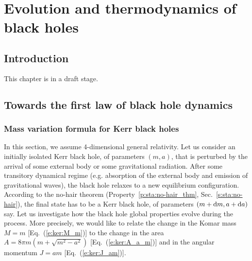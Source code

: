 \chapter{Evolution and thermodynamics of black holes}
\label{s:evo}

\minitoc

\section{Introduction}

This chapter is in a draft stage.

\section{Towards the first law of black hole dynamics}

\subsection{Mass variation formula for Kerr black holes}

In this section, we assume 4-dimensional general relativity.
Let us consider an initially isolated Kerr black hole, of parameters $(m,a)$,
that is perturbed by the arrival of some external body or some gravitational
radiation. After some transitory dynamical regime (e.g. absorption of the
external body and emission of gravitational waves), the black hole relaxes
to a new equilibrium configuration. According to the
no-hair theorem (Property~\ref{p:sta:no-hair_thm}, Sec.~\ref{s:sta:no-hair}),
the final state has to be a Kerr black hole, of
parameters $(m+\mathrm{d} m, a+\mathrm{d} a)$ say.
Let us investigate how the black hole global properties evolve during the
process. More precisely, we would like to relate the change
in the Komar mass $M = m$ [Eq.~(\ref{e:ker:M_m})] to the change in
the area $A = 8 \pi m (m + \sqrt{m^2-a^2})$ [Eq.~(\ref{e:ker:A_a_m})]
and in the angular momentum $J = a m$ [Eq.~(\ref{e:ker:J_am})].

